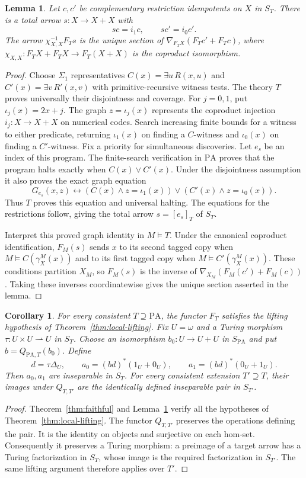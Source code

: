 \documentclass[11pt]{article}
\newtheorem{lemma}[theorem]{Lemma}
\newtheorem{corollary}[theorem]{Corollary}
\newcommand{\PA}{\mathrm{PA}}
\begin{document}
\begin{lemma}\label{lem:switch}
Let $c,c'$ be complementary restriction idempotents on $X$ in $S_T$.
There is a total arrow $s:X\to X+X$ with
\[
 sc=i_1c,\qquad sc'=i_0c'.
\]
The arrow $\chi_{X,X}^{-1}F_Ts$ is the unique section of
$\nabla_{F_TX}(F_Tc'+F_Tc)$, where
$\chi_{X,X}:F_TX+F_TX\to F_T(X+X)$ is the coproduct isomorphism.
\end{lemma}
\begin{proof}
Choose $\Sigma_1$ representatives $C(x)=\exists u\,R(x,u)$ and
$C'(x)=\exists v\,R'(x,v)$ with primitive-recursive witness tests.
The theory $T$ proves universally their disjointness and coverage.
For $j=0,1$, put $\iota_j(x)=2x+j$. The graph
$z=\iota_j(x)$ represents the coproduct injection
$i_j:X\to X+X$ on numerical codes.
Search increasing finite bounds for a witness to either predicate,
returning $\iota_1(x)$ on finding a $C$-witness and $\iota_0(x)$
on finding a $C'$-witness. Fix a priority for simultaneous discoveries.
Let $e_s$ be an index of this program. The finite-search verification
in $\PA$ proves that the program halts
exactly when $C(x)\lor C'(x)$. Under the disjointness assumption it also
proves the exact graph equation
\[
 G_{e_s}(x,z)\leftrightarrow
 (C(x)\land z=\iota_1(x))\lor(C'(x)\land z=\iota_0(x)).
\]
Thus $T$ proves this equation and universal halting. The equations for
the restrictions follow, giving the total arrow $s=[e_s]_T$ of $S_T$.

Interpret this proved graph identity in $M\models T$.
Under the canonical coproduct identification, $F_M(s)$ sends
$x$ to its second tagged copy when
$M\models C(\gamma_X^M(x))$ and to its first tagged copy when
$M\models C'(\gamma_X^M(x))$.
These conditions partition $X_M$, so $F_M(s)$ is the inverse of
$\nabla_{X_M}(F_M(c')+F_M(c))$.
Taking these inverses coordinatewise gives the unique section
asserted in the lemma.
\end{proof}

\begin{corollary}\label{cor:pair}
For every consistent $T\supseteq\PA$, the functor $F_T$ satisfies the
lifting hypothesis of Theorem~\ref{thm:local-lifting}.
Fix $U=\omega$ and a Turing morphism
$\tau:U\times U\rightharpoonup U$ in $S_T$.
Choose an isomorphism $b_0:U\to U+U$ in $S_{\PA}$ and put
$b=Q_{\PA,T}(b_0)$. Define
\[
 d=\tau\Delta_U,\qquad
 a_0=(bd)^*(1_U+0_U),\qquad a_1=(bd)^*(0_U+1_U).
\]
Then $a_0,a_1$ are inseparable in $S_T$. For every consistent
extension $T'\supseteq T$, their images under $Q_{T,T'}$ are the
identically defined inseparable pair in $S_{T'}$.
\end{corollary}
\begin{proof}
Theorem~\ref{thm:faithful} and Lemma~\ref{lem:switch} verify all the
hypotheses of Theorem~\ref{thm:local-lifting}.
The functor $Q_{T,T'}$ preserves the operations defining the pair.
It is the identity on objects and surjective on each hom-set.
Consequently it preserves a Turing morphism: a preimage of a
target arrow has a Turing factorization in $S_T$, whose image is
the required factorization in $S_{T'}$.
The same lifting argument therefore applies over $T'$.
\end{proof}
\end{document}

